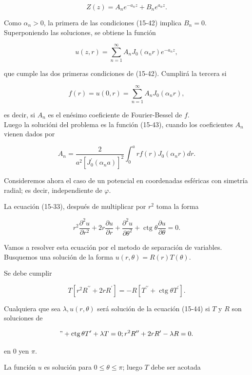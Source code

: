 \documentclass[10pt]{article}
\theoremstyle{plain}
\theoremstyle{definition}
\theoremstyle{remark}
\begin{document}
$$
Z(z)=A_{n} e^{-a_{n} z}+B_{n} e^{a_{n} z} .
$$

Como $\alpha_{n}>0$, la primera de las condiciones (15-42) implica $B_{n}=0$. Superponiendo las soluciones, se obtiene la función


\begin{equation*}
u(z, r)=\sum_{n=1}^{\infty} A_{n} J_{0}\left(\alpha_{n} r\right) e^{-a_{n} z}, \tag{15-43}
\end{equation*}


que cumple las dos primeras condiciones de (15-42). Cumplirá la tercera si

$$
f(r)=u(0, r)=\sum_{n=1}^{\infty} A_{n} J_{0}\left(\alpha_{n} r\right),
$$

es decir, si $A_{n}$ es el enésimo coeficiente de Fourier-Bessel de $f$.\\
Luego la solucióni del problema es la función (15-43), cuando los coeficientes $A_{n}$ vienen dados por

$$
A_{n}=\frac{2}{a^{2}\left[J_{0}^{\prime}\left(\alpha_{n} a\right)\right]^{2}} \int_{0}^{a} r f(r) J_{0}\left(\alpha_{n} r\right) d r .
$$

Consideremos ahora el caso de un potencial en coordenadas esféricas con simetría radial; es decir, independiente de $\varphi$.

La ecuación (15-33), después de multiplicar por $r^{2}$ toma la forma


\begin{equation*}
r^{2} \frac{\partial^{2} u}{\partial r^{2}}+2 r \frac{\partial u}{\partial r}+\frac{\partial^{2} u}{\partial \theta^{2}}+\operatorname{ctg} \theta \frac{\partial u}{\partial \theta}=0 . \tag{15-44}
\end{equation*}


Vamos a resolver esta ecuación por el metodo de separación de variables. Busquemos una solución de la forma $u(r, \theta)=R(r) T(\theta)$.

Se debe cumplir

$$
T\left[r^{2} R^{\prime \prime}+2 r R^{\prime}\right]=-R\left[T^{\prime \prime}+\operatorname{ctg} \theta T^{\prime}\right] .
$$

Cualquiera que sea $\lambda, u(r, \theta)$ será solución de la ecuación (15-44) si $T$ y $R$ son soluciones de

$$
"+\operatorname{ctg} \theta T^{\prime}+\lambda T=0 ; r^{2} R^{\prime \prime}+2 r R^{\prime}-\lambda R=0 .
$$

en 0 yen $\pi$.

La función $u$ es solución para $0 \leqslant \theta \leqslant \pi$; luego $T$ debe ser acotada
\end{document}

